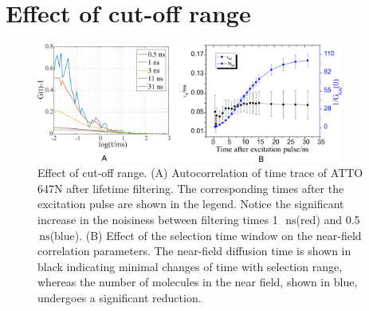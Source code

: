 \documentclass[11pt,a4paper,onecolumn]{article}
\newcommand{\ns}{\ensuremath{\,\textrm{ns}}}
\begin{document}
\section{Effect of cut-off range}
\begin{figure}[ht]
  \centering
  \includegraphics[width=0.9\textwidth]{cutoff_effect.png}
  \makeatletter
  \renewcommand{\fnum@figure}{\figurename~S\thefigure}
  \makeatother{}
  \caption{Effect of cut-off range. (A) Autocorrelation of time trace of ATTO 647N after lifetime filtering. 
  The corresponding times after the excitation pulse are shown in the legend. Notice the significant increase in the 
  noisiness between filtering times 1~\ns (red) and 0.5~\ns (blue). (B) Effect of the selection time window on the 
  near-field correlation parameters. The near-field diffusion time is shown in black indicating minimal changes of 
  time with selection range, whereas the number of molecules in the near field, shown in blue, undergoes a 
  significant reduction.}
  \label{SIfig:cutoff-effect}
\end{figure}
\end{document}
